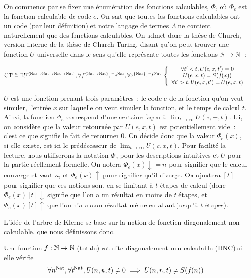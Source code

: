 \documentclass{article}
\begin{document}
On commence par se fixer une énumération des fonctions calculables, $\Phi$, où $\Phi_e$ est la fonction calculable de code $e$. On sait que toutes les fonctions calculables ont un code (par leur définition) et notre langage de termes $\Lambda$ ne contient naturellement que des fonctions calculables. On admet donc la thèse de Church, version interne de la thèse de Church-Turing, disant qu'on peut trouver une fonction $U$ universelle dans le sens qu'elle représente toutes les fonctions $\mathbb{N} \to \mathbb{N}$~:

\[\mathrm{CT} \triangleq\exists U^{\{\mathrm{Nat}\to\mathrm{Nat}\to\mathrm{Nat}\to\mathrm{Nat}\}}, \forall f^{\{\mathrm{Nat}\to\mathrm{Nat}\}}, \exists e^{\mathrm{Nat}}, \forall x^{\{\mathrm{Nat}\}}, \exists t^{\mathrm{Nat}},
  \left\{\begin{array}{c}
  \forall t' < t, U(e,x,t') = 0\\
  U(e,x,t) = S(f(x))\\
  \forall t' > t, U(e,x,t') = U(e,x,t)
  \end{array}\right.\]

$U$ est une fonction prenant trois paramètres~: le code $e$ de la fonction qu'on veut simuler, l'entrée $x$ sur laquelle on veut simuler la fonction, et le temps de calcul $t$. Ainsi, la fonction $\Phi_e$ correspond d'une certaine  façon à $\lim_{t \to \infty} U(e,-,t)$. Ici, on considère que la valeur retournée par $U(e,x,t)$ est potentiellement vide~: c'est ce que signifie le fait de retourner $0$. On décide donc que la valeur $\Phi_e(x)$, si elle existe, est ici le prédécesseur de $\lim_{t \to\infty} U(e,x,t)$. Pour facilité la lecture, nous utiliserons la notation $\Phi_e$ pour les descriptions intuitives et $U$ pour la partie réellement formelle. On notera $\Phi_e(x) \downarrow= n$ pour signifier que le calcul converge et vaut $n$, et $\Phi_e(x) \uparrow$ pour signifier qu'il diverge. On ajoutera $[t]$ pour signifier que ces notions sont en se limitant à $t$ étapes de calcul (donc $\Phi_e(x)[t]\downarrow$ signifie que l'on a un résultat en moins de $t$ étapes, et $\Phi_e(x)[t]\uparrow$ que l'on n'a aucun résultat même en allant jusqu'à $t$ étapes).

L'idée de l'arbre de Kleene se base sur la notion de fonction diagonalement non calculable, que nous définissons donc.

\begin{defi}
    Une fonction $f : \mathbb{N} \to \mathbb{N}$ (totale) est dite diagonalement non calculable (DNC) si elle vérifie
    \[\forall n^{\mathrm{Nat}}, \forall t^{\mathrm{Nat}}, U(n,n,t) \neq 0 \implies U(n,n,t) \neq S(f(n))\]
\end{defi}
\end{document}
